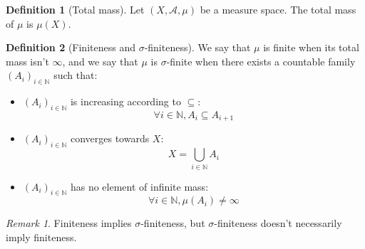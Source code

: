 \documentclass{article}
\theoremstyle{definition}
\newtheorem{definition}{Definition}[section]
\theoremstyle{remark}
\newtheorem*{remark}{Remark}
\theoremstyle{example}
\begin{document}
\begin{definition}[Total mass]
    Let $(X, \mathcal{A}, \mu)$ be a measure space. The total mass of $\mu$ is $\mu(X)$.
\end{definition}

\begin{definition}[Finiteness and $\sigma$-finiteness]
    We say that $\mu$ is finite when its total mass isn't $\infty$, and we say that $\mu$ is $\sigma$-finite when there exists a countable family $(A_i)_{i \in \mathbb{N}}$ such that:
    \begin{itemize}
        \item $(A_i)_{i \in \mathbb{N}}$ is increasing according to $\subseteq$:
            $$\forall i \in \mathbb{N}, A_i \subseteq A_{i+1}$$
        \item $(A_i)_{i \in \mathbb{N}}$ converges towards $X$:
            $$X = \bigcup_{i \in \mathbb{N}} A_i$$
        \item $(A_i)_{i \in \mathbb{N}}$ has no element of infinite mass:
            $$\forall i \in \mathbb{N}, \mu(A_i) \neq \infty$$
    \end{itemize}
\end{definition}

\begin{remark}
    Finiteness implies $\sigma$-finiteness, but $\sigma$-finiteness doesn't necessarily imply finiteness.
\end{remark}
\end{document}
